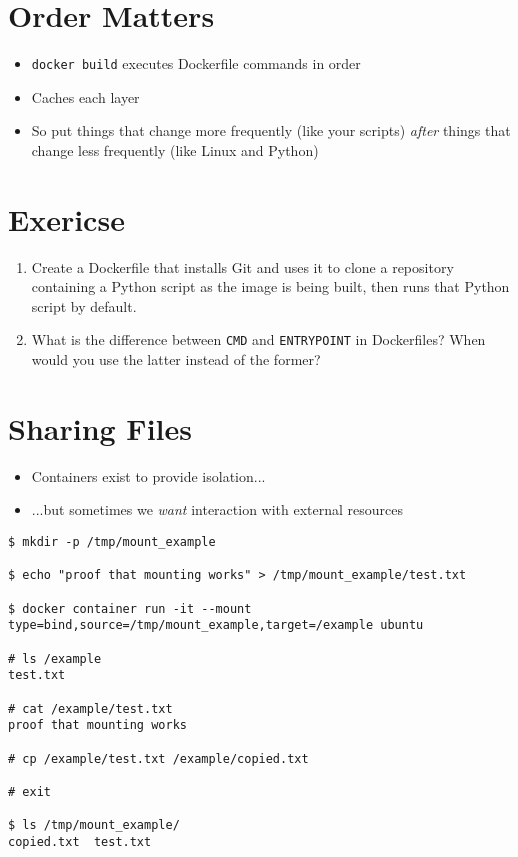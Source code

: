 \documentclass[krantzl]{krantz}
\begin{document}
\section{Order Matters}
\begin{itemize}
\item \texttt{docker build} executes Dockerfile commands in order

\item Caches each layer

\item So put things that change more frequently (like your scripts)
    \emph{after} things that change less frequently (like Linux and Python)

\end{itemize}
\section{Exericse}
\begin{enumerate}
\item 

Create a Dockerfile that installs Git
    and uses it to clone a repository containing a Python script
    as the image is being built,
    then runs that Python script by default.



\item 

What is the difference between \texttt{CMD} and \texttt{ENTRYPOINT} in Dockerfiles?
    When would you use the latter instead of the former?



\end{enumerate}
\section{Sharing Files}
\begin{itemize}
\item Containers exist to provide isolation...

\item ...but sometimes we \emph{want} interaction with external resources

\end{itemize}
\begin{lstlisting}[frame=tblr,backgroundcolor=\color{black!5}]
$ mkdir -p /tmp/mount_example

$ echo "proof that mounting works" > /tmp/mount_example/test.txt

$ docker container run -it --mount type=bind,source=/tmp/mount_example,target=/example ubuntu

# ls /example
test.txt

# cat /example/test.txt
proof that mounting works

# cp /example/test.txt /example/copied.txt

# exit

$ ls /tmp/mount_example/
copied.txt  test.txt
\end{lstlisting}
\end{document}
